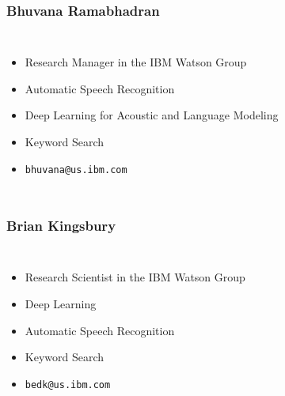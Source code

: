 \begin{frame}
  \frametitle{Bhuvana Ramabhadran}
  \begin{columns}[T]
    \column{2in}
    \begin{itemize}
    \item Research Manager in the IBM Watson Group
    \item Automatic Speech Recognition
    \item Deep Learning for Acoustic and Language Modeling
    \item Keyword Search
    \item \texttt{bhuvana@us.ibm.com}
    \end{itemize}
    \column{2in}
  \end{columns}
\end{frame}

\begin{frame}
  \frametitle{Brian Kingsbury}
  \begin{columns}[T]
    \column{2in}
    \begin{itemize}
    \item Research Scientist in the IBM Watson Group
    \item Deep Learning
    \item Automatic Speech Recognition
    \item Keyword Search
    \item \texttt{bedk@us.ibm.com}
    \end{itemize}
    \column{2in}
  \end{columns}
\end{frame}
